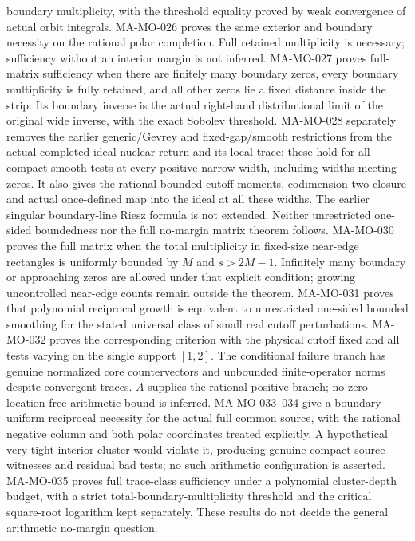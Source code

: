 \documentclass[11pt,a4paper]{article}
\begin{document}
boundary multiplicity, with the threshold equality proved by
weak convergence of actual orbit integrals. MA-MO-026 proves
the same exterior and boundary necessity on the rational
polar completion. Full retained multiplicity is necessary;
sufficiency without an interior margin is not inferred.
MA-MO-027 proves full-matrix sufficiency when there are finitely
many boundary zeros, every boundary multiplicity is fully retained,
and all other zeros lie a fixed distance inside the strip. Its
boundary inverse is the actual right-hand distributional limit of
the original wide inverse, with the exact Sobolev threshold.
MA-MO-028 separately removes the earlier generic/Gevrey and
fixed-gap/smooth restrictions from the actual completed-ideal
nuclear return and its local trace: these hold for all compact
smooth tests at every positive narrow width, including widths
meeting zeros. It also gives the rational bounded cutoff moments,
codimension-two closure and actual once-defined map into the ideal
at all these widths. The earlier singular boundary-line Riesz
formula is not extended. Neither unrestricted one-sided
boundedness nor the full no-margin matrix theorem follows.
MA-MO-030 proves the full matrix when the total multiplicity
in fixed-size near-edge rectangles is uniformly bounded by
$M$ and $s>2M-1$. Infinitely many boundary or approaching
zeros are allowed under that explicit condition; growing
uncontrolled near-edge counts remain outside the theorem.
MA-MO-031 proves that polynomial reciprocal growth is
equivalent to unrestricted one-sided bounded smoothing for
the stated universal class of small real cutoff perturbations.
MA-MO-032 proves the corresponding criterion with the physical
cutoff fixed and all tests varying on the single support $[1,2]$.
The conditional failure branch has genuine normalized core
countervectors and unbounded finite-operator norms despite
convergent traces. $A$ supplies the rational positive branch;
no zero-location-free arithmetic bound is inferred.
MA-MO-033--034 give a boundary-uniform reciprocal necessity for
the actual full common source, with the rational negative column
and both polar coordinates treated explicitly. A hypothetical
very tight interior cluster would violate it, producing genuine
compact-source witnesses and residual bad tests; no such
arithmetic configuration is asserted. MA-MO-035 proves full
trace-class sufficiency under a polynomial cluster-depth budget,
with a strict total-boundary-multiplicity threshold and the
critical square-root logarithm kept separately. These results
do not decide the general arithmetic no-margin question.
\end{document}
